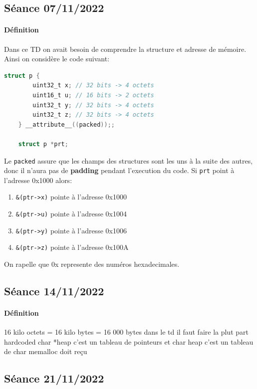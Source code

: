 \documentclass{article}
\begin{document}
\subsection{Séance 07/11/2022}
\paragraph{Définition}Dans ce TD on avait besoin de comprendre la structure et adresse de mémoire. Ainsi on considère le code suivant:
\begin{scriptsize}\mycode
    \begin{lstlisting}[language=C]
    struct p {
        uint32_t x; // 32 bits -> 4 octets
        uint16_t u; // 16 bits -> 2 octets
        uint32_t y; // 32 bits -> 4 octets
        uint32_t z; // 32 bits -> 4 octets
    } __attribute__((packed));;

    struct p *prt;
    \end{lstlisting}
\end{scriptsize}
Le \texttt{packed} assure que les champs des structures sont les uns à la suite des autres, donc il n'aura pas de \textbf{padding} pendant l'execution du code. Si \texttt{prt} point à l'adresse 0x1000 alors:
\begin{enumerate}[noitemsep]
    \item \texttt{\&(ptr->x)} pointe à l'adresse 0x1000
    \item \texttt{\&(ptr->u)} pointe à l'adresse 0x1004
    \item \texttt{\&(ptr->y)} pointe à l'adresse 0x1006
    \item \texttt{\&(ptr->z)} pointe à l'adresse 0x100A
\end{enumerate}
On rapelle que 0x represente des numéros hexadecimales.

\newpage\subsection{Séance 14/11/2022}
\paragraph{Définition}16 kilo octets = 16 kilo bytes = 16 000 bytes
dans le td il faut faire la plut part hardcoded
char *heap c'est un tableau de pointeurs et char heap c'est un tableau de char
memalloc doit reçu

\newpage\subsection{Séance 21/11/2022}
\end{document}
